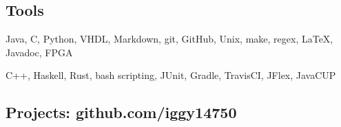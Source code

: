 \documentclass[18pt]{article}
\providecommand{\tightlist}{
    \setlength{\itemsep}{0pt}\setlength{\parskip}{0pt}
}
\begin{document}
  \subsection*{Tools}\label{languages}
  \begin{description}\tightlist
      \item[Proficient:] Java,
      C,
      Python,
      VHDL,
      Markdown,
      git,
      GitHub,
      Unix,
      make,
      regex,
      \LaTeX,
      Javadoc,
      FPGA
      \item[Learning:] C++, 
      Haskell, 
      Rust,
      bash scripting,      
      JUnit, 
      Gradle,
      TravisCI,
      JFlex,
      JavaCUP
  \end{description}


    \subsection*{Projects: github.com/iggy14750}\label{projects}
\end{document}
